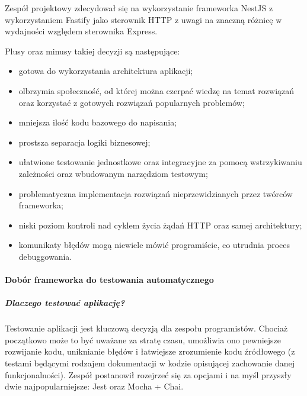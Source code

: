 \documentclass[12pt, a4paper, twoside, openany]{book}
\begin{document}
Zespół projektowy zdecydował się na wykorzystanie frameworka NestJS z wykorzystaniem
Fastify jako sterownik HTTP z uwagi na znaczną różnicę w wydajności względem sterownika Express.

Plusy oraz minusy takiej decyzji są następujące:

\begin{itemize}
    \item gotowa do wykorzystania architektura aplikacji;
    \item olbrzymia społeczność, od której można czerpać wiedzę na temat rozwiązań 
    oraz korzystać z gotowych rozwiązań popularnych problemów;
    \item mniejsza ilość kodu bazowego do napisania;
    \item prostsza separacja logiki biznesowej;
    \item ułatwione testowanie jednostkowe oraz integracyjne za pomocą wstrzykiwaniu
    zależności oraz wbudowanym narzędziom testowym;
    \item problematyczna implementacja rozwiązań nieprzewidzianych przez twórców
    frameworka;
    \item niski poziom kontroli nad cyklem życia żądań HTTP oraz samej architektury;
    \item komunikaty błędów mogą niewiele mówić programiście, co utrudnia proces debuggowania.
\end{itemize}

\paragraph{Dobór frameworka do testowania automatycznego}
\subparagraph{Dlaczego testować aplikację?\\}

Testowanie aplikacji jest kluczową decyzją dla zespołu programistów.
Chociaż początkowo może to być uważane za stratę czasu, umożliwia ono pewniejsze rozwijanie kodu, uniknianie błędów i łatwiejsze zrozumienie kodu źródłowego (z testami będącymi rodzajem dokumentacji w kodzie opisującej zachowanie danej funkcjonalności).
Zespół postanowił rozejrzeć się za opcjami i na myśl przyszły dwie najpopularniejsze: Jest oraz Mocha + Chai.
\end{document}
